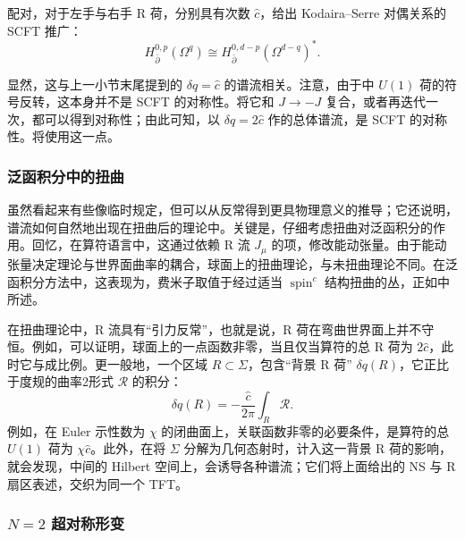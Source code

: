 配对，对于左手与右手 R 荷，分别具有次数 $\widehat c$，给出 Kodaira--Serre 对偶关系的 SCFT 推广：
\begin{equation}\label{eq:3.109}
H^{0,p}_{\bar\partial}(\Omega^q)
\cong H^{0,d-p}_{\bar\partial}(\Omega^{d-q})^*.
\end{equation}

显然，这与上一小节末尾提到的 $\delta q=\widehat c$ 的谱流相关。注意，由于中 $U(1)$ 荷的符号反转，这本身并不是 SCFT 的对称性。将它和 $J\to-J$ 复合，或者再迭代一次，都可以得到对称性；由此可知，以 $\delta q=2\widehat c$ 作的总体谱流，是 SCFT 的对称性。将使用这一点。

\subsubsection{泛函积分中的扭曲}\label{sec:3.3.5.1}

虽然看起来有些像临时规定，但可以从反常得到更具物理意义的推导；它还说明，谱流如何自然地出现在扭曲后的理论中。关键是，仔细考虑扭曲对泛函积分的作用。回忆，在算符语言中，这通过依赖 R 流 $J_\mu$ 的项，修改能动张量。由于能动张量决定理论与世界面曲率的耦合，球面上的扭曲理论，与未扭曲理论不同。在泛函积分方法中，这表现为，费米子取值于经过适当 $\operatorname{spin}^c$ 结构扭曲的丛，正如中所述。

在扭曲理论中，R 流具有“引力反常”，也就是说，R 荷在弯曲世界面上并不守恒。例如，可以证明，球面上的一点函数非零，当且仅当算符的总 R 荷为 $2\widehat c$，此时它与成比例。更一般地，一个区域 $R\subset\Sigma$，包含“背景 R 荷” $\delta q(R)$，它正比于度规的曲率2形式 $\mathcal{R}$ 的积分：
\begin{equation}\label{eq:3.110}
\delta q(R)=-\frac{\widehat c}{2\pi}\int_R\mathcal{R}.
\end{equation}
例如，在 Euler 示性数为 $\chi$ 的闭曲面上，关联函数非零的必要条件，是算符的总 $U(1)$ 荷为 $\chi\widehat c$。此外，在将 $\Sigma$ 分解为几何态射时，计入这一背景 R 荷的影响，就会发现，中间的 Hilbert 空间上，会诱导各种谱流；它们将上面给出的 NS 与 R 扇区表述，交织为同一个 TFT。

\subsubsection{\texorpdfstring{$N=2$}{N=2} 超对称形变}\label{sec:3.3.5.2}

